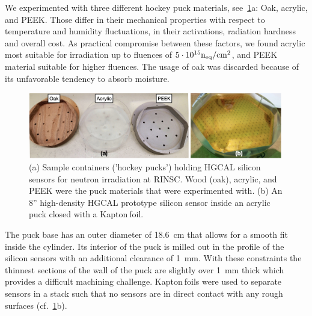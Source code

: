 We experimented with three different hockey puck materials, see~\ref{fig:Pucks_Arrayed}a: Oak, acrylic, and PEEK. 
Those differ in their mechanical properties with respect to temperature and humidity fluctuations, in their activations, radiation hardness and overall cost.
As practical compromise between these factors, we found acrylic most suitable for irradiation up to fluences of $5\cdot 10^{15}\mathrm{n_{eq}}/\mathrm{cm}^{2}$, and PEEK material suitable for higher fluences. 
The usage of oak was discarded because of its unfavorable tendency to absorb moisture.
\begin{figure}
  \begin{center}
    \includegraphics[width=0.99\textwidth]{figures/figures_edited_002.jpeg}
    \caption{(a) Sample containers ('hockey pucks') holding HGCAL silicon sensors for neutron irradiation at RINSC. 
    Wood (oak), acrylic, and PEEK were the puck materials that were experimented with.
    (b) An 8'' high-density HGCAL prototype silicon sensor inside an acrylic puck closed with a Kapton\texttrademark$~$foil.}
    \label{fig:Pucks_Arrayed}
  \end{center}
\end{figure}
The puck base has an outer diameter of \SI{18.6}{\centi\metre} that allows for a smooth fit inside the cylinder. 
Its interior of the puck is milled out in the profile of the silicon sensors with an additional clearance of \SI{1}{\milli\metre}. 
With these constraints the thinnest sections of the wall of the puck are slightly over \SI{1}{\milli\metre} thick which provides a difficult machining challenge.
Kapton\texttrademark$~$foils were used to separate sensors in a stack such that no sensors are in direct contact with any rough surfaces (cf.~\ref{fig:Pucks_Arrayed}b).
